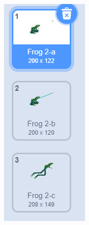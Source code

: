 \documentclass[10pt, a4paper]{article}
\begin{document}
\begin{enumerate}
\begin{figure}[htbp]
\begin{minipage}[t]{.1\textwidth}
                \includegraphics[width=\textwidth]{21.png}

\end{minipage}
\end{figure}
\end{enumerate}
\end{document}
